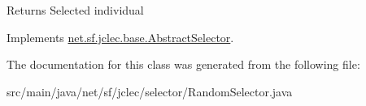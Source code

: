 \begin{DoxyReturn}{Returns}
Selected individual 
\end{DoxyReturn}


Implements \hyperlink{classnet_1_1sf_1_1jclec_1_1base_1_1_abstract_selector_aa2ccb539c608db9c14ebbc763807b95a}{net.\-sf.\-jclec.\-base.\-Abstract\-Selector}.



The documentation for this class was generated from the following file\-:\begin{DoxyCompactItemize}
\item 
src/main/java/net/sf/jclec/selector/Random\-Selector.\-java\end{DoxyCompactItemize}
